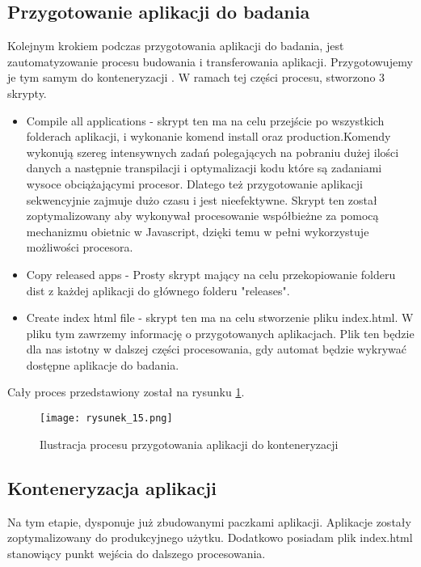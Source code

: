 \subsection{Przygotowanie aplikacji do badania}

Kolejnym krokiem podczas przygotowania aplikacji do badania, jest zautomatyzowanie procesu budowania i transferowania aplikacji. Przygotowujemy je tym samym do konteneryzacji \cite{kontenery}. W ramach tej części procesu, stworzono 3 skrypty.
\begin{itemize}
    \item Compile all applications - skrypt ten ma na celu przejście po wszystkich folderach aplikacji, i wykonanie komend install oraz production.Komendy wykonują szereg intensywnych zadań polegających na pobraniu dużej ilości danych a następnie transpilacji \cite{Transpilator} i optymalizacji kodu które są zadaniami wysoce obciążającymi procesor. Dlatego też przygotowanie aplikacji sekwencyjnie zajmuje dużo czasu i jest nieefektywne.
    Skrypt ten został zoptymalizowany aby wykonywał procesowanie współbieżne za pomocą mechanizmu obietnic \cite{promise}  w Javascript, dzięki temu w pełni wykorzystuje możliwości procesora.
    \item Copy released apps - Prosty skrypt mający na celu przekopiowanie folderu dist z każdej aplikacji do głównego folderu "releases".
    \item Create index html file - skrypt ten ma na celu stworzenie pliku index.html. W pliku tym zawrzemy informację o przygotowanych aplikacjach. Plik ten będzie dla nas istotny w dalszej części procesowania, gdy automat będzie wykrywać dostępne  aplikacje do badania.
\end{itemize}

Cały proces przedstawiony został na rysunku \ref{fig:rysunek_15}.

\begin{figure}[htbp]
    \centering
    \texttt{[image: rysunek\_15.png]}
    \caption{Ilustracja procesu przygotowania aplikacji do konteneryzacji}
    \label{fig:rysunek_15}
\end{figure}

\subsection{Konteneryzacja aplikacji}

Na tym etapie, dysponuje już zbudowanymi paczkami aplikacji. Aplikacje zostały zoptymalizowany do produkcyjnego użytku. Dodatkowo posiadam plik index.html stanowiący punkt wejścia do dalszego procesowania.

